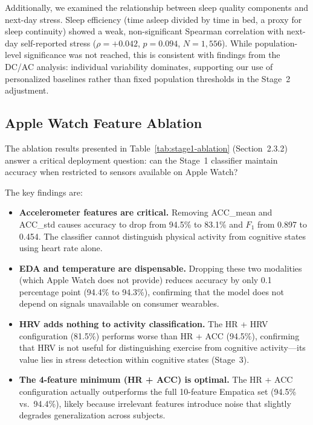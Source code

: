 \documentclass[12pt,letterpaper]{article}
\begin{document}
Additionally, we examined the relationship between sleep quality components and next-day stress. Sleep efficiency (time asleep divided by time in bed, a proxy for sleep continuity) showed a weak, non-significant Spearman correlation with next-day self-reported stress ($\rho = +0.042$, $p = 0.094$, $N = 1{,}556$). While population-level significance was not reached, this is consistent with findings from the DC/AC analysis: individual variability dominates, supporting our use of personalized baselines rather than fixed population thresholds in the Stage~2 adjustment.

\subsection{Apple Watch Feature Ablation}

The ablation results presented in Table~\ref{tab:stage1-ablation} (Section~2.3.2) answer a critical deployment question: can the Stage~1 classifier maintain accuracy when restricted to sensors available on Apple Watch?

The key findings are:

\begin{itemize}
    \item \textbf{Accelerometer features are critical.} Removing ACC\_mean and ACC\_std causes accuracy to drop from 94.5\% to 83.1\% and $F_1$ from 0.897 to 0.454. The classifier cannot distinguish physical activity from cognitive states using heart rate alone.
    \item \textbf{EDA and temperature are dispensable.} Dropping these two modalities (which Apple Watch does not provide) reduces accuracy by only 0.1 percentage point (94.4\% to 94.3\%), confirming that the model does not depend on signals unavailable on consumer wearables.
    \item \textbf{HRV adds nothing to activity classification.} The HR + HRV configuration (81.5\%) performs worse than HR + ACC (94.5\%), confirming that HRV is not useful for distinguishing exercise from cognitive activity---its value lies in stress detection within cognitive states (Stage~3).
    \item \textbf{The 4-feature minimum (HR + ACC) is optimal.} The HR + ACC configuration actually outperforms the full 10-feature Empatica set (94.5\% vs.\ 94.4\%), likely because irrelevant features introduce noise that slightly degrades generalization across subjects.
\end{itemize}
\end{document}
